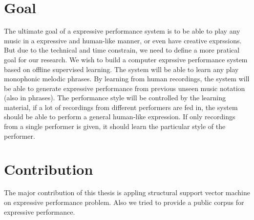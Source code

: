\section{Goal}
The ultimate goal of a expressive performance system is to be able to play any music in a expressive and human-like manner, or even have creative exprssions. But due to the technical and time constrain, we need to define a more pratical goal for our research. We wish to build a computer exprssive performance system based on offline supervised learning. The system will be able to learn any play monophonic melodic phrases. By learning from human recordings, the system will be able to generate expressive performance from previous unseen music notation (also in phrases). The performance style will be controlled by the learning material, if a lot of recordings from different performers are fed in, the system should be able to perform a general human-like expression. If only recordings from a single performer is given, it should learn the particular style of the performer.




\section{Contribution}
The major contribution of this thesis is appling structural support vector machine on expressive performance problem. Also we tried to provide a public corpus for expressive performance. 
%
%
